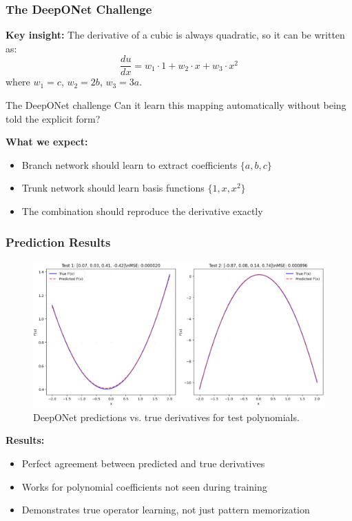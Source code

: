 \documentclass[notes]{beamer}
\begin{document}
\begin{frame}
\frametitle{The DeepONet Challenge}

\textbf{Key insight:} The derivative of a cubic is always quadratic, so it can be written as:
\begin{equation*}
\frac{du}{dx} = w_1 \cdot 1 + w_2 \cdot x + w_3 \cdot x^2
\end{equation*}
where $w_1 = c$, $w_2 = 2b$, $w_3 = 3a$.

\vspace{1cm}

\begin{alertblock}{The DeepONet challenge}
Can it learn this mapping automatically without being told the explicit form?
\end{alertblock}

\vspace{0.5cm}

\textbf{What we expect:} 
\begin{itemize}
    \item Branch network should learn to extract coefficients $\{a, b, c\}$
    \item Trunk network should learn basis functions $\{1, x, x^2\}$
    \item The combination should reproduce the derivative exactly
\end{itemize}

\end{frame}


\begin{frame}
\frametitle{Prediction Results}

\begin{figure}[ht]
	\centering
	\includegraphics[width=\textwidth]{figs/prediction_results.png}
	\caption*{DeepONet predictions vs. true derivatives for test polynomials.}
\end{figure}

\textbf{Results:}
\begin{itemize}
    \item Perfect agreement between predicted and true derivatives
    \item Works for polynomial coefficients not seen during training
    \item Demonstrates true operator learning, not just pattern memorization
\end{itemize}

\end{frame}
\end{document}
